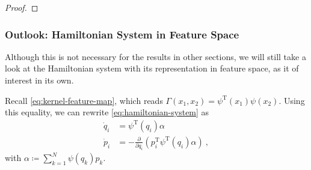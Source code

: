 \begin{proof}
\end{proof}

\subsubsection{Outlook: Hamiltonian System in Feature Space}
Although this is not necessary for the results in other sections, we will still take a look at the Hamiltonian system with its representation in feature space, as it of interest in its own.

Recall \cref{eq:kernel-feature-map}, which reads $\Gamma(x_1, x_2) = \psi^\mathrm{T}(x_1)\psi(x_2)$.
Using this equality, we can rewrite \cref{eq:hamiltonian-system} as
\begin{equation}
\label{eq:feature-hamiltonian}
	\begin{split}
		\dot{q}_i &= \psi^\mathrm{T}(q_i) \alpha\\
		\dot{p}_i &= -\frac{\partial}{\partial q_i} \left(p_i^\mathrm{T} \psi^\mathrm{T}(q_i) \alpha \right)\ ,
	\end{split}
\end{equation}
with $\alpha \coloneqq \sum_{k=1}^{N} \psi(q_k) p_k$.

